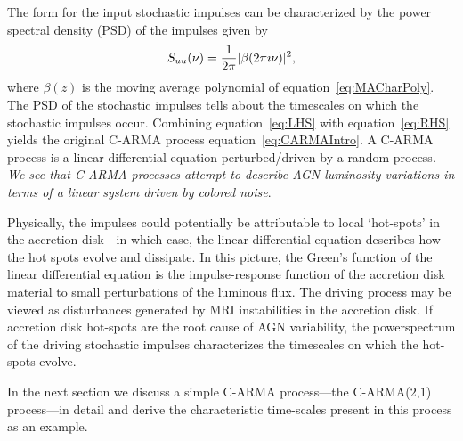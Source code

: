 \documentclass[a4paper,fleqn,usenatbib]{mnras}
\begin{document}
The form for the input stochastic impulses can be characterized by the power spectral density (PSD) of the impulses given by
\begin{equation}\label{eq:ImpulsePSD}
S_{uu}(\nu) = \frac{1}{2 \pi } |\beta(2 \pi \imath \nu)|^{2},
\end{equation}
where $\beta(z)$ is the moving average polynomial of equation~\eqref{eq:MACharPoly}. The PSD of the stochastic impulses tells about the timescales on which the stochastic impulses occur. Combining equation~\eqref{eq:LHS} with equation~\eqref{eq:RHS} yields the original C-ARMA process equation~\eqref{eq:CARMAIntro}. A C-ARMA process is a linear differential equation perturbed/driven by a random process. \textit{We see that C-ARMA processes attempt to describe AGN luminosity variations in terms of a linear system driven by colored noise}.

Physically, the impulses could potentially be attributable to local `hot-spots' in the accretion disk---in which case, the linear differential equation describes how the hot spots evolve and dissipate. In this picture, the Green's function of the linear differential equation is the impulse-response function of the accretion disk material to small perturbations of the luminous flux. The driving process may be viewed as disturbances generated by MRI instabilities in the accretion disk. If accretion disk hot-spots are the root cause of AGN variability, the powerspectrum of the driving stochastic impulses characterizes the timescales on which the hot-spots evolve.


In the next section we discuss a simple C-ARMA process---the C-ARMA($2$,$1$) process---in detail and derive the characteristic time-scales present in this process as an example.
\end{document}
